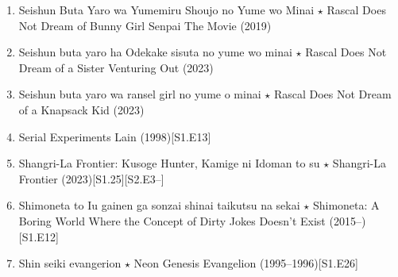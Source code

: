 \documentclass{article}
\begin{document}
\begin{enumerate}
    \item {\sc Seishun Buta Yaro wa Yumemiru Shoujo no Yume wo Minai $\star$ Rascal Does Not Dream of Bunny Girl Senpai The Movie} (2019)
    \item {\sc Seishun buta yaro ha Odekake sisuta no yume wo minai $\star$ Rascal Does Not Dream of a Sister Venturing Out} (2023)
    \item {\sc Seishun buta yaro wa ransel girl no yume o minai $\star$ Rascal Does Not Dream of a Knapsack Kid} (2023)
    \item {\sc Serial Experiments Lain} (1998)\hfill[S1.E13]
    \item {\sc Shangri-La Frontier: Kusoge Hunter, Kamige ni Idoman to su $\star$ Shangri-La Frontier} (2023)\hfill[S1.25][S2.E3--]
    \item {\sc Shimoneta to Iu gainen ga sonzai shinai taikutsu na sekai $\star$ Shimoneta: A Boring World Where the Concept of Dirty Jokes Doesn't Exist} (2015--)\hfill[S1.E12]
    \item {\sc Shin seiki evangerion $\star$ Neon Genesis Evangelion} (1995--1996)\hfill[S1.E26]
    

\end{enumerate}
\end{document}
